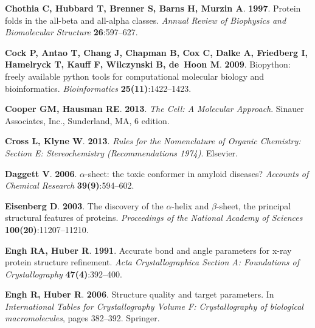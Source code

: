\documentclass[fleqn,10pt,lineno]{wlpeerj} %
\begin{document}
\begin{thebibliography}{60}
\textbf{Chothia C, Hubbard T, Brenner S, Barns H, Murzin A}. \textbf{1997}.
\newblock Protein folds in the all-beta and all-alpha classes.
\newblock \emph{Annual Review of Biophysics and Biomolecular Structure} \textbf{26}:597--627.

\textbf{Cock P, Antao T, Chang J, Chapman B, Cox C, Dalke A, Friedberg I,
  Hamelryck T, Kauff F, Wilczynski B, de~Hoon M}. \textbf{2009}.
\newblock Biopython: freely available python tools for computational molecular
  biology and bioinformatics.
\newblock \emph{Bioinformatics} \textbf{25(11)}:1422--1423.

\textbf{Cooper GM, Hausman RE}. \textbf{2013}.
\newblock \emph{The Cell: A Molecular Approach}.
\newblock Sinauer Associates, Inc., Sunderland, MA, 6 edition.

\textbf{Cross L, Klyne W}. \textbf{2013}.
\newblock \emph{Rules for the Nomenclature of Organic Chemistry: Section E:
  Stereochemistry (Recommendations 1974)}.
\newblock Elsevier.

\textbf{Daggett V}. \textbf{2006}.
\newblock $\alpha$-sheet: the toxic conformer in amyloid diseases?
\newblock \emph{Accounts of Chemical Research} \textbf{39(9)}:594--602.

\textbf{Eisenberg D}. \textbf{2003}.
\newblock The discovery of the $\alpha$-helix and $\beta$-sheet, the principal
  structural features of proteins.
\newblock \emph{Proceedings of the National Academy of Sciences}
  \textbf{100(20)}:11207--11210.

\textbf{Engh RA, Huber R}. \textbf{1991}.
\newblock Accurate bond and angle parameters for x-ray protein structure
  refinement.
\newblock \emph{Acta Crystallographica Section A: Foundations of
  Crystallography} \textbf{47(4)}:392--400.

\textbf{Engh R, Huber R}. \textbf{2006}.
\newblock Structure quality and target parameters.
\newblock In \emph{International Tables for Crystallography Volume F:
  Crystallography of biological macromolecules}, pages 382--392. Springer.


\end{thebibliography}
\end{document}
